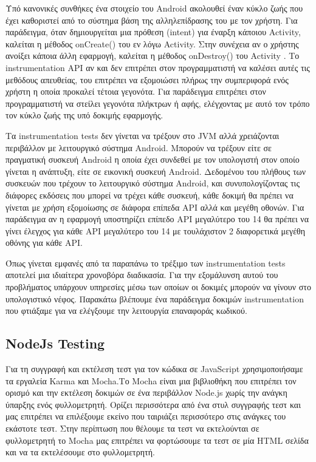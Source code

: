 		Υπό κανονικές συνθήκες ένα στοιχείο του Android ακολουθεί έναν κύκλο ζωής που έχει καθοριστεί από το σύστημα βάση της αλληλεπίδρασης του με τον χρήστη. Για παράδειγμα, όταν δημιουργείται μια πρόθεση (intent) για έναρξη κάποιου Activity, καλείται η μέθοδος onCreate() του εν λόγω Activity. Στην συνέχεια αν ο χρήστης ανοίξει κάποια άλλη εφαρμογή, καλείται η μέθοδος onDestroy() του Activity . Το instrumentation API αν και δεν επιτρέπει στον προγραμματιστή να καλέσει αυτές τις μεθόδους απευθείας, του επιτρέπει να εξομοιώσει πλήρως την συμπεριφορά ενός χρήστη η οποία προκαλεί τέτοια γεγονότα. Για παράδειγμα επιτρέπει στον προγραμματιστή να στείλει γεγονότα πλήκτρων ή αφής, ελέγχοντας με αυτό τον τρόπο τον κύκλο ζωής της υπό δοκιμής εφαρμογής\cite{androidTestingBook}.

		Τα instrumentation tests δεν γίνεται να τρέξουν στο JVM αλλά χρειάζονται περιβάλλον με λειτουργικό σύστημα Android. Μπορούν να τρέξουν είτε σε πραγματική συσκευή Android η οποία έχει συνδεθεί με τον υπολογιστή στον οποίο γίνεται η ανάπτυξη, είτε σε εικονική συσκευή Android. Δεδομένου του πλήθους των συσκευών που τρέχουν το λειτουργικό σύστημα Android, και συνυπολογίζοντας τις διάφορες εκδόσεις που μπορεί να τρέχει κάθε συσκευή, κάθε δοκιμή θα πρέπει να γίνεται με χρήση εξομοίωσης σε διάφορα επίπεδα API αλλά και μεγέθη οθονών. Για παράδειγμα αν η εφαρμογή υποστηρίζει επίπεδο API μεγαλύτερο του 14 θα πρέπει να γίνει έλεγχος για κάθε API μεγαλύτερο του 14 με τουλάχιστον 2 διαφορετικά μεγέθη οθόνης για κάθε API. 
		
		Όπως γίνεται εμφανές από τα παραπάνω το τρέξιμο των instrumentation tests αποτελεί μια ιδιαίτερα χρονοβόρα διαδικασία. Για την εξομάλυνση αυτού του προβλήματος υπάρχουν υπηρεσίες μέσω των οποίων οι δοκιμές μπορούν να γίνουν στο υπολογιστικό νέφος. Παρακάτω βλέπουμε ένα παράδειγμα δοκιμών instrumentation που φτιάξαμε για να ελέγξουμε την λειτουργία επαναφοράς κωδικού.
		
		
		
		\subsection{NodeJs Testing}
		
		
		Για τη συγγραφή και εκτέλεση τεστ για τον κώδικα σε JavaScript χρησιμοποιήσαμε τα εργαλεία Karma και Mocha.Το Mocha είναι μια βιβλιοθήκη που επιτρέπει τον ορισμό και την εκτέλεση δοκιμών σε ένα περιβάλλον Node.js χωρίς την ανάγκη ύπαρξης ενός φυλλομετρητή. Ορίζει περισσότερα από ένα στυλ συγγραφής τεστ και μας επιτρέπει να επιλέξουμε εκείνο που ταιριάζει περισσότερο στις ανάγκες του εκάστοτε τεστ. Στην περίπτωση που θέλουμε τα τεστ να εκτελούνται σε φυλλομετρητή το Mocha μας επιτρέπει να φορτώσουμε τα τεστ σε μία HTML σελίδα και να τα εκτελέσουμε στο φυλλομετρητή.
		
